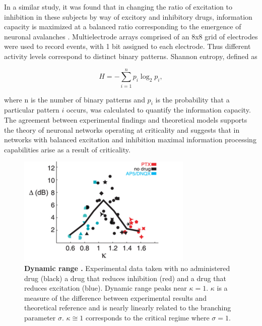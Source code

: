 \documentclass[12pt]{article}
\begin{document}
In a similar study, it was found that in changing the ratio of excitation to inhibition in these subjects by way of excitory and inhibitory drugs, information capacity is maximized at a balanced ratio corresponding to the emergence of neuronal avalanches \cite{Shew2011a}. Multielectrode arrays comprised of an 8x8 grid of electrodes were used to record events, with 1 bit assigned to each electrode. Thus different activity levels correspond to distinct binary patterns. Shannon entropy, defined as

\begin{equation}
H = - \sum^{n}_{i=1}p_{i}\log_{2}p_{i},
\end{equation}

\noindent where n is the number of binary patterns and $ p_{i} $ is the probability that a particular pattern $i$ occurs, was calculated to quantify the information capacity. The agreement between experimental findings and theoretical models supports the theory of neuronal networks operating at criticality and suggests that in networks with balanced excitation and inhibition maximal information processing capabilities arise as a result of criticality. 

\begin{figure}      
  \begin{center}    
 \includegraphics[width=.6\textwidth]{dynamicrangeexpplenz}    
    \caption{\textbf{Dynamic range \cite{Shew2009b}.} Experimental data taken with no administered drug (black) a drug that reduces inhibition (red) and a drug that reduces excitation (blue). Dynamic range peaks near $\kappa = 1$. $\kappa$ is a measure of the difference between experimental results and theoretical reference and is nearly linearly related to the branching parameter $\sigma$. $\kappa \cong 1$ corresponds to the critical regime where $\sigma = 1$.}
   \label{Figure::Dynamic Range Experiment}   
  \end{center}     
   \end{figure}
  
\end{document}
